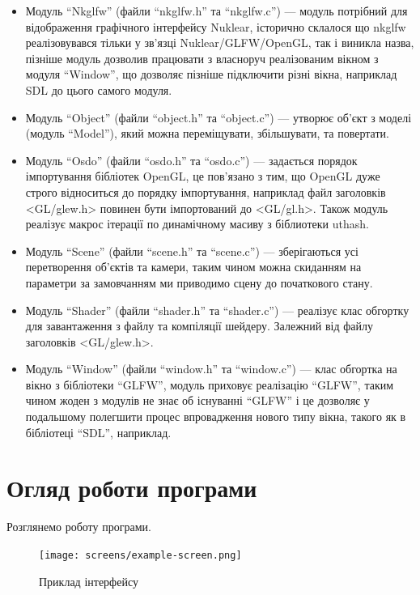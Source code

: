 \documentclass[14pt,a4paper]{extarticle}
\theoremstyle{definition}
\renewcommand{\[}{\begin{singlespace}\begin{equation*}}
\renewcommand{\]}{\end{equation*}\end{singlespace}}
\begin{document}
\begin{itemize}
\item Модуль ``Nkglfw'' (файли ``nkglfw.h'' та ``nkglfw.c'') --- модуль потрібний для відображення графічного інтерфейсу Nuklear, історично склалося що nkglfw реалізовувався тільки у зв'язці Nuklear/GLFW/OpenGL, так і виникла назва, пізніше модуль дозволив працювати з власноруч реалізованим вікном з модуля ``Window'', що дозволяє пізніше підключити різні вікна, наприклад SDL до цього самого модуля.

\item Модуль ``Object'' (файли ``object.h'' та ``object.c'') --- утворює об'єкт з моделі (модуль ``Model''), який можна переміщувати, збільшувати, та повертати.

\item Модуль ``Osdo'' (файли ``osdo.h'' та ``osdo.c'') --- задається порядок імпортування бібліотек OpenGL, це пов'язано з тим, що OpenGL дуже строго відноситься до порядку імпортування, наприклад файл заголовків <GL/glew.h> повинен бути імпортований до <GL/gl.h>. Також модуль реалізує макрос ітерації по динамічному масиву з біблиотеки uthash.

\item Модуль ``Scene'' (файли ``scene.h'' та ``scene.c'') --- зберігаються усі перетворення об'єктів та камери, таким чином можна скиданням на параметри за замовчанням ми приводимо сцену до початкового стану.

\item Модуль ``Shader'' (файли ``shader.h'' та ``shader.c'') --- реалізує клас обгортку для завантаження з файлу та компіляції шейдеру. Залежний від файлу заголовків <GL/glew.h>.

\item Модуль ``Window'' (файли ``window.h'' та ``window.c'') --- клас обгортка на вікно з бібліотеки ``GLFW'', модуль приховує реалізацію ``GLFW'', таким чином жоден з модулів не знає об існуванні ``GLFW'' і це дозволяє у подальшому полегшити процес впровадження нового типу вікна, такого як в бібліотеці ``SDL'', наприклад.
\end{itemize}

\section{Огляд роботи програми}

Розглянемо роботу програми.

\begin{figure}[!htb]
    \centering
    \texttt{[image: screens/example-screen.png]}
    \caption{Приклад інтерфейсу}\label{fig:example-screen}
\end{figure}
\end{document}
